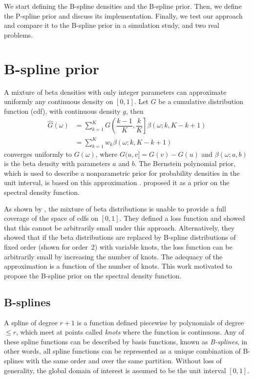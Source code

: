 \documentclass[aps,reprint,amsmath,amssymb,showpacs,showkeys]{revtex4-1}%
\begin{document}
We start defining the B-spline densities and the B-spline prior. Then, we define the P-spline prior and discuss its implementation.  Finally, we test our approach and compare it to the B-spline prior in a simulation study, and two real problems.

\section{B-spline prior}

A mixture of beta densities with only integer parameters can approximate uniformly any continuous density on $[0,1]$.  Let $G$ be a cumulative distribution function (cdf), with continuous density $g$, then 
\begin{align*}
\widehat{G}(\omega) &= \sum_{k=1}^{K} G \left( \dfrac{k-1}{K} , \dfrac{k}{K} \right] \beta(\omega; k, K-k+1)\\
&= \sum_{k=1}^{K} w_k \beta(\omega; k, K-k+1)
\end{align*}	  
converges uniformly to $G(\omega)$, where $G(u,v] = G(v) - G(u)$ and $\beta(\omega; a,b)$ is the beta density with parameters $a$ and $b$.
The Bernstein polynomial prior, which is used to describe a nonparametric prior for probability densities in the unit interval, is based on this approximation \citep{Petrone:1999a,Petrone:199b}.  \cite{Choudhuri:2004} proposed it as a prior on the spectral density function.

As shown by \cite{Perron:2001}, the mixture of beta distributions is unable to provide a full coverage of the space of cdfs on $[0,1]$.  They defined a loss function and showed that this cannot be arbitrarily small under this approach.  Alternatively, they showed that if the beta distributions are replaced by B-spline distributions of fixed order (shown for order~2) with variable knots, the loss function can be arbitrarily small by increasing the number of knots.  The adequacy of the approximation is a function of the number of knots.  This work motivated \cite{Edwards2018} to propose the B-spline prior on the spectral density function.

\subsection*{B-splines}

A spline of degree $r+1$ is a function defined piecewise by polynomials of degree $\leq r$, which meet at points called \textit{knots} where the function is continuous.  Any of these spline functions can be described by basis functions, known as \textit{B-splines}, in other words, all spline functions can be represented as a unique combination of B-splines with the same order and over the same partition.  Without loss of generality, the global domain of interest is assumed to be the unit interval $[0,1]$.
\end{document}
